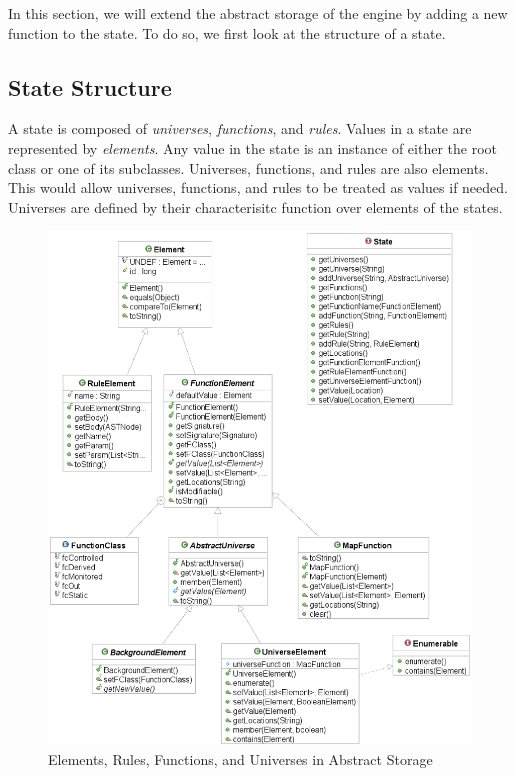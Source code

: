 \documentclass{article}
\begin{document}
In this section, we will extend the abstract storage of the engine 
by adding a new function to the state.
To do so, we first look at the structure of a \CoreASM state.

\subsection{\CoreASM State Structure}

A \CoreASM state is composed of {\em
universes}, {\em functions}, and {\em
rules}. Values in a \CoreASM state are represented by {\em
elements}. Any value in the state is an instance of either the
root class  or one of its subclasses. Universes,
functions, and rules are also elements. This would allow universes, functions,
and rules to be treated as values if needed.  Universes are defined by their
characterisitc function over elements of the states.

\begin{figure}
\includegraphics[width=\textwidth]{figures/AbstractStorageStructure.eps}
\caption{Elements, Rules, Functions, and Universes in Abstract Storage}
\label{fig:absstorage}
\end{figure}
\end{document}
